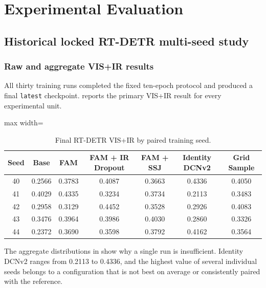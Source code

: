 \chapter{Experimental Evaluation}
\label{chap:evaluation}

\section{Historical locked RT-DETR multi-seed study}
\label{sec:rtdetr-main-results}

\subsection{Raw and aggregate VIS+IR results}

All thirty training runs completed the fixed ten-epoch protocol and produced a
final \texttt{latest} checkpoint.  reports the primary
VIS+IR \mapfifty{} result for every experimental unit.

\begin{table}[htbp]
  \centering
  \caption{Final RT-DETR VIS+IR \mapfifty{} by paired training seed.}
  \label{tab:rtdetr-raw}
  \begin{adjustbox}{max width=\textwidth}
  \begin{tabular}{ccccccc}
    \toprule
    Seed & Base & FAM & FAM + IR Dropout & FAM + SSJ & Identity DCNv2 & Grid Sample \\
    \midrule
    40 & 0.2566 & 0.3783 & 0.4087 & 0.3663 & 0.4336 & 0.4050 \\
    41 & 0.4029 & 0.4335 & 0.3234 & 0.3734 & 0.2113 & 0.3483 \\
    42 & 0.2958 & 0.3129 & 0.4452 & 0.3528 & 0.2926 & 0.4083 \\
    43 & 0.3476 & 0.3964 & 0.3986 & 0.4030 & 0.2860 & 0.3326 \\
    44 & 0.2372 & 0.3690 & 0.3598 & 0.3792 & 0.4162 & 0.3564 \\
    \bottomrule
  \end{tabular}
  \end{adjustbox}
\end{table}

The aggregate distributions in  show why a single
run is insufficient. Identity DCNv2 ranges from 0.2113 to 0.4336, and the
highest value of several individual seeds belongs to a configuration that is
not best on average or consistently paired with the reference.

